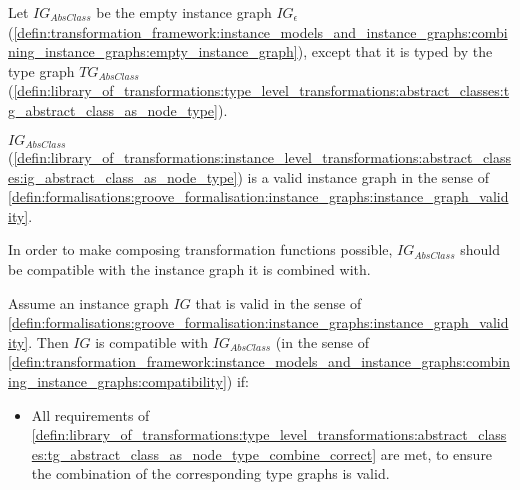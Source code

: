 \begin{defin}
\label{defin:library_of_transformations:instance_level_transformations:abstract_classes:ig_abstract_class_as_node_type}
Let $IG_{AbsClass}$ be the empty instance graph $IG_\epsilon$ (\cref{defin:transformation_framework:instance_models_and_instance_graphs:combining_instance_graphs:empty_instance_graph}), except that it is typed by the type graph $TG_{AbsClass}$ (\cref{defin:library_of_transformations:type_level_transformations:abstract_classes:tg_abstract_class_as_node_type}).
\end{defin}

\begin{thm}
\label{defin:library_of_transformations:instance_level_transformations:abstract_classes:ig_class_as_node_type_correct}
$IG_{AbsClass}$ (\cref{defin:library_of_transformations:instance_level_transformations:abstract_classes:ig_abstract_class_as_node_type}) is a valid instance graph in the sense of \cref{defin:formalisations:groove_formalisation:instance_graphs:instance_graph_validity}.
\end{thm}

In order to make composing transformation functions possible, $IG_{AbsClass}$ should be compatible with the instance graph it is combined with.

\begin{thm}
\label{defin:library_of_transformations:instance_level_transformations:abstract_classes:ig_abstract_class_as_node_type_combine_correct}
Assume an instance graph $IG$ that is valid in the sense of \cref{defin:formalisations:groove_formalisation:instance_graphs:instance_graph_validity}. Then $IG$ is compatible with $IG_{AbsClass}$ (in the sense of \cref{defin:transformation_framework:instance_models_and_instance_graphs:combining_instance_graphs:compatibility}) if:
\begin{itemize}
    \item All requirements of \cref{defin:library_of_transformations:type_level_transformations:abstract_classes:tg_abstract_class_as_node_type_combine_correct} are met, to ensure the combination of the corresponding type graphs is valid.
\end{itemize}
\end{thm}

